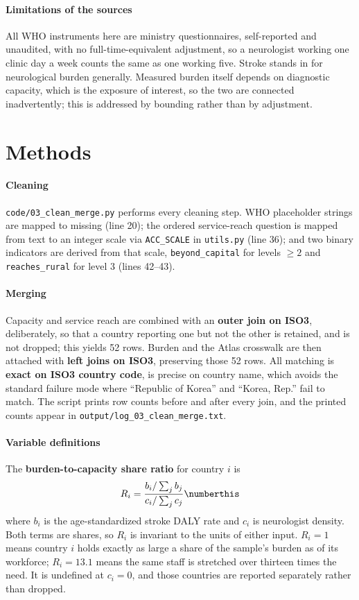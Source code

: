 \documentclass[9pt,twoside]{pnas-new}
\begin{document}
\paragraph{Limitations of the sources} All WHO instruments here are ministry
questionnaires, self-reported and unaudited, with no full-time-equivalent
adjustment, so a neurologist working one clinic day a week counts the same as
one working five. Stroke stands in for neurological burden generally. Measured
burden itself depends on diagnostic capacity, which is the exposure of interest,
so the two are connected inadvertently; this is addressed by bounding rather
than by adjustment.

\section*{Methods}

\paragraph{Cleaning} \texttt{code/03\_clean\_merge.py} performs every cleaning
step. WHO placeholder strings are mapped to missing (line 20); the ordered
service-reach question is mapped from text to an integer scale via
\texttt{ACC\_SCALE} in \texttt{utils.py} (line 36); and two binary indicators are
derived from that scale, \texttt{beyond\_capital} for levels $\ge 2$ and
\texttt{reaches\_rural} for level $3$ (lines 42--43).

\paragraph{Merging} Capacity and service reach are combined with an
\textbf{outer join on ISO3}, deliberately, so that a country reporting one but
not the other is retained, and is not dropped; this yields 52 rows. Burden and
the Atlas crosswalk are then attached with \textbf{left joins on ISO3},
preserving those 52 rows. All matching is \textbf{exact on ISO3 country code},
is precise on country name, which avoids the standard failure mode where
``Republic of Korea'' and ``Korea, Rep.'' fail to match. The script prints row
counts before and after every join, and the printed counts appear in
\texttt{output/log\_03\_clean\_merge.txt}.

\paragraph{Variable definitions} The \textbf{burden-to-capacity share ratio}
for country $i$ is
%
\begin{align*}
R_i = \frac{b_i / \sum_j b_j}{c_i / \sum_j c_j} \numberthis \label{eqn:ratio}
\end{align*}
%
where $b_i$ is the age-standardized stroke DALY rate and $c_i$ is neurologist
density. Both terms are shares, so $R_i$ is invariant to the units of either
input. $R_i = 1$ means country $i$ holds exactly as large a share of the
sample's burden as of its workforce; $R_i = 13.1$ means the same staff is
stretched over thirteen times the need. It is undefined at $c_i = 0$, and those
countries are reported separately rather than dropped.
\end{document}
